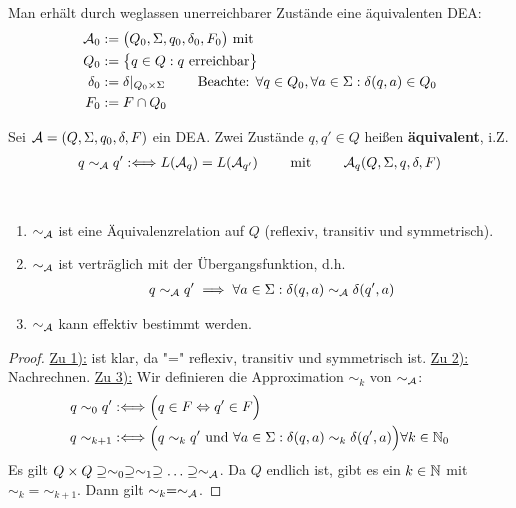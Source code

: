 Man erhält durch weglassen unerreichbarer Zustände eine äquivalenten DEA:
\begin{align*}
	\mathcal{A}_0&:=\big(Q_0,\Sigma,q_0,\delta_0,F_0\big)\text{ mit }\\
	Q_0&:=\big\lbrace q\in Q:q\text{ erreichbar}\big\rbrace\\
	\delta_0&:=\delta|_{Q_0\times\Sigma}\qquad\text{ Beachte: }\forall q\in Q_0,\forall a\in\Sigma:\delta(q,a)\in Q_0\\
	F_0&:=F\cap Q_0
\end{align*}

\begin{definition}\label{def2.8}
	Sei $\mathcal{A}=(Q,\Sigma,q_0,\delta,F)$ ein DEA.
	Zwei Zustände $q,q'\in Q$ heißen \textbf{äquivalent}, i.Z.
	\begin{align*}
		q\sim_{\mathcal{A}} q':\Longleftrightarrow L(\mathcal{A}_q)=L(\mathcal{A}_{q'})
		\qquad\text{ mit }\qquad
		\mathcal{A}_q(Q,\Sigma,q,\delta,F)
	\end{align*}
\end{definition}

\begin{lemma}\label{lemma2.9}\
	\begin{enumerate}[label=\arabic*)]
		\item $\sim_{\mathcal{A}}$ ist eine Äquivalenzrelation auf $Q$ (reflexiv, transitiv und symmetrisch).
		\item $\sim_{\mathcal{A}}$ ist verträglich mit der Übergangsfunktion, d.h.
		\begin{align*}
			q\sim_{\mathcal{A}} q'\implies \forall a\in \Sigma:\delta(q,a)\sim_{\mathcal{A}}\delta(q',a)
		\end{align*}
		\item $\sim_{\mathcal{A}}$ kann effektiv bestimmt werden.
	\end{enumerate}
\end{lemma}

\begin{proof}
	\underline{Zu 1):} ist klar, da "=" reflexiv, transitiv und symmetrisch ist.\nl
	\underline{Zu 2):} Nachrechnen.\nl
	\underline{Zu 3):} Wir definieren die Approximation $\sim_k$ von $\sim_{\mathcal{A}}$:
	\begin{align*}
		q\sim_0 q'&:\Longleftrightarrow\Big( q\in F\Leftrightarrow q'\in F\Big)\\
		q\sim_{k+1}&:\Longleftrightarrow\Big(q\sim_k q'\text{ und }\forall a\in\Sigma:\delta(q,a)\sim_k\delta(q',a)\Big)\forall k\in\mathbb{N}_0
	\end{align*}
	Es gilt $Q\times Q\supseteq\sim_0\supseteq\sim_1\supseteq\ldots\supseteq\sim_{\mathcal{A}}$.
	Da $Q$ endlich ist, gibt es ein $k\in\mathbb{N}$ mit $\sim_k=\sim_{k+1}$.
	Dann gilt $\sim_k=\sim_{\mathcal{A}}$.
\end{proof}

